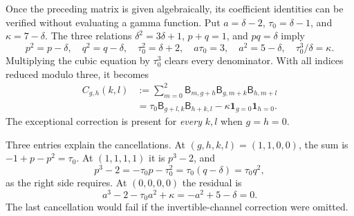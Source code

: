 \begin{example}
\label{ex:HI-n3-cubics}
Once the preceding matrix is given algebraically, its coefficient
identities can be verified without evaluating a gamma function.
Put $a=\delta-2$, $\tau_0=\delta-1$, and $\kappa=7-\delta$.
The three relations
$\delta^2=3\delta+1$, $p+q=1$, and $pq=\delta$ imply
\[
 p^2=p-\delta,\quad q^2=q-\delta,\quad
 \tau_0^2=\delta+2,\quad a\tau_0=3,\quad
 a^2=5-\delta,\quad \tau_0^3/\delta=\kappa.
\]
Multiplying the cubic equation by $\tau_0^3$ clears every
denominator. With all indices reduced modulo three, it becomes
\begin{equation}\label{eq:HI-n3-cleared-cubic}
 \begin{split}
 C_{g,h}(k,l)&:=\sum_{m=0}^2
       \mathsf B_{m,g+h}\mathsf B_{g,m+k}\mathsf B_{h,m+l}\\
 &=\tau_0\mathsf B_{g+l,k}\mathsf B_{h+k,l}
        -\kappa\mathbf1_{g=0}\mathbf1_{h=0}.
 \end{split}
\end{equation}
The exceptional correction is present for \emph{every} $k,l$
when $g=h=0$.

Three entries explain the cancellations. At $(g,h,k,l)=(1,1,0,0)$,
the sum is $-1+p-p^2=\tau_0$. At $(1,1,1,1)$ it is
$p^3-2$, and
\[
 p^3-2=-\tau_0p-\tau_0^2
       =\tau_0(q-\delta)=\tau_0q^2,
\]
as the right side requires. At $(0,0,0,0)$ the residual is
\[
 a^3-2-\tau_0a^2+\kappa=-a^2+5-\delta=0.
\]
The last cancellation would fail if the invertible-channel
correction were omitted.


\end{example}
